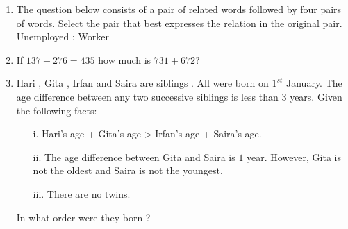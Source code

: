 \documentclass[journal,12pt,onecolumn]{IEEEtran}
\theoremstyle{remark}
\begin{document}
\begin{enumerate}
\item The question below consists of a pair of related words followed by four pairs of words. Select the pair that best expresses the relation in the original pair.
Unemployed : Worker
\hfill{}
\begin{enumerate}
\end{enumerate}

\item If $137 + 276 = 435$ how much is $731 + 672$?
\hfill{}
\begin{enumerate}
\end{enumerate}

\item Hari , Gita , Irfan  and Saira  are siblings . All were born on $1^{st}$ January. The age difference between any two successive siblings  is less than $3$ years. Given the following facts:
\begin{enumerate}
    \item[i.] Hari's age + Gita's age > Irfan's age + Saira's age.
    \item[ii.] The age difference between Gita and Saira is $1$ year. However, Gita is not the oldest and Saira is not the youngest.
    \item[iii.] There are no twins.
\end{enumerate}
In what order were they born ?
\hfill{}
\begin{enumerate}
\end{enumerate}


\end{enumerate}
\end{document}
